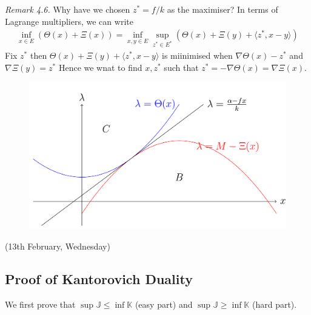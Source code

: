 \documentclass[12pt,a4paper]{article}
\begin{document}
\emph{Remark 4.6.} Why have we chosen $z^* = f/k$ as the maximiser? In terms of Lagrange multipliers, we can write
\begin{align*}
\inf_{x\in E} (\Theta(x) + \Xi(x)) = \inf_{x, y\in E} \sup_{z^*\in E^*}(\Theta(x) + \Xi(y) + \langle z^*, x-y \rangle)
\end{align*}
Fix $z^*$  then $\Theta(x) + \Xi(y) + \langle z^*, x-y \rangle$ is miinimised when $\nabla \Theta(x) - z^*$ and $\nabla \Xi(y) = z^*$ Hence we wnat to find $x, z^*$ such that $z^* = - \nabla \Theta(x) = \nabla \Xi(x)$.

\begin{figure}[h]
\begin{center}
    \includegraphics[scale=0.15]{5}
\end{center}
\end{figure}
\s

\newday

(13th February, Wednesday)

\subsection{Proof of Kantorovich Duality}

We first prove that  $\sup \mathbb{J} \leq \inf \mathbb{K}$ (easy part) and $\sup \mathbb{J} \geq \inf \mathbb{K}$ (hard part).
\s
\end{document}

